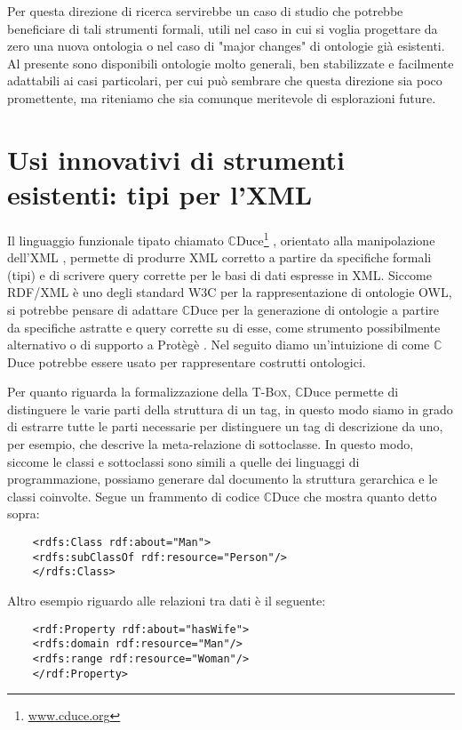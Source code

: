 Per questa direzione di ricerca servirebbe un caso di studio che potrebbe beneficiare di tali strumenti formali, utili nel caso in cui si voglia progettare 
da zero una nuova ontologia o nel caso di "major changes" di ontologie già esistenti. Al presente sono disponibili ontologie molto generali, ben stabilizzate 
e facilmente adattabili ai casi particolari, per cui può sembrare che questa direzione sia poco promettente, ma riteniamo che sia comunque meritevole di 
esplorazioni future.

\section{\large Usi innovativi di strumenti esistenti: tipi per l'XML}
Il linguaggio funzionale tipato chiamato $\mathbb{C}$Duce\footnote{\url{www.cduce.org}} \cite{CDuce}, orientato alla manipolazione dell'XML \cite{XML}, permette di produrre XML corretto a partire da specifiche formali (tipi) e di scrivere query corrette per le basi di dati espresse in XML. Siccome RDF/XML è uno degli standard W3C per la 
rappresentazione di ontologie OWL, si potrebbe pensare di adattare $\mathbb{C}$Duce per la generazione di ontologie a partire da specifiche astratte e query corrette su 
di esse, come strumento possibilmente alternativo o di supporto a Protègè \cite{protege}. Nel seguito diamo un'intuizione di come $\mathbb{C}$Duce potrebbe essere usato per rappresentare costrutti ontologici.

Per quanto riguarda la formalizzazione della \textsc{T-Box}, $\mathbb{C}$Duce permette di distinguere le varie parti della struttura di un tag, in questo modo siamo in grado di 
estrarre tutte le parti necessarie per distinguere un tag di descrizione da uno, per esempio, che descrive la meta-relazione di sottoclasse. In questo modo, 
siccome le classi e sottoclassi sono simili a quelle dei linguaggi di programmazione, possiamo generare dal documento la struttura gerarchica e le classi 
coinvolte. Segue un frammento di codice $\mathbb{C}$Duce che mostra quanto detto sopra:
\begin{verbatim}
	<rdfs:Class rdf:about="Man">
	<rdfs:subClassOf rdf:resource="Person"/>
	</rdfs:Class>
\end{verbatim}
Altro esempio riguardo alle relazioni tra dati è il seguente:
\begin{verbatim}
	<rdf:Property rdf:about="hasWife">
	<rdfs:domain rdf:resource="Man"/>
	<rdfs:range rdf:resource="Woman"/>
	</rdf:Property>
\end{verbatim}

